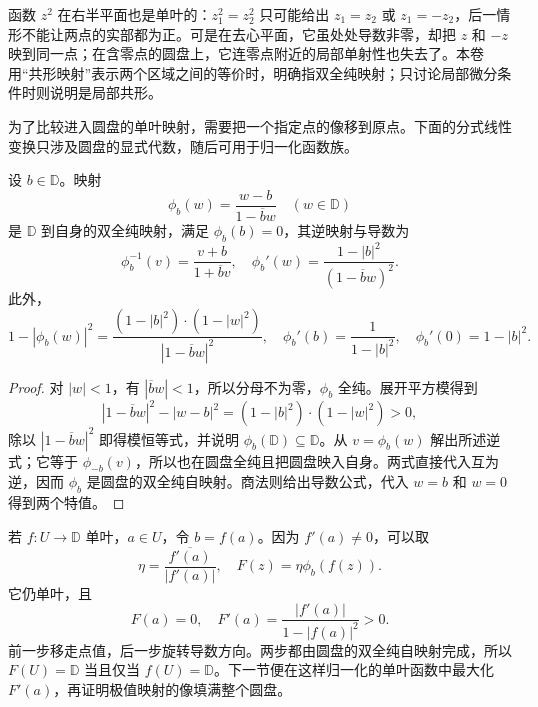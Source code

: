 \ProseParagraphBreak

函数 \(z^2\) 在右半平面也是单叶的：\(z_1^2=z_2^2\) 只可能给出 \(z_1=z_2\) 或 \(z_1=-z_2\)，后一情形不能让两点的实部都为正。可是在去心平面，它虽处处导数非零，却把 \(z\) 和 \(-z\) 映到同一点；在含零点的圆盘上，它连零点附近的局部单射性也失去了。本卷用“共形映射”表示两个区域之间的等价时，明确指双全纯映射；只讨论局部微分条件时则说明是局部共形。

\ProseParagraphBreak

为了比较进入圆盘的单叶映射，需要把一个指定点的像移到原点。下面的分式线性变换只涉及圆盘的显式代数，随后可用于归一化函数族。

\begin{proposition}[圆盘的基点变换]\label{b3:prop:05-disk-basepoint-map}
设 \(b\in\mathbb D\)。映射
\[
 \phi_b(w)=\frac{w-b}{1-\overline b w}\quad(w\in\mathbb D)
\]
是 \(\mathbb D\) 到自身的双全纯映射，满足 \(\phi_b(b)=0\)，其逆映射与导数为
\[
 \phi_b^{-1}(v)=\frac{v+b}{1+\overline b v},
 \quad \phi_b'(w)=\frac{1-|b|^2}{(1-\overline b w)^2}.
\]
此外，
\[
 1-|\phi_b(w)|^2
 =\frac{(1-|b|^2)\cdot(1-|w|^2)}{|1-\overline b w|^2},
 \quad
 \phi_b'(b)=\frac1{1-|b|^2},
 \quad\phi_b'(0)=1-|b|^2.
\]
\end{proposition}
\begin{proof}
对 \(|w|<1\)，有 \(|\overline b w|<1\)，所以分母不为零，\(\phi_b\) 全纯。展开平方模得到
\[
 |1-\overline b w|^2-|w-b|^2
 =(1-|b|^2)\cdot(1-|w|^2)>0,
\]
除以 \(|1-\overline b w|^2\) 即得模恒等式，并说明 \(\phi_b(\mathbb D)\subseteq\mathbb D\)。从 \(v=\phi_b(w)\) 解出所述逆式；它等于 \(\phi_{-b}(v)\)，所以也在圆盘全纯且把圆盘映入自身。两式直接代入互为逆，因而 \(\phi_b\) 是圆盘的双全纯自映射。商法则给出导数公式，代入 \(w=b\) 和 \(w=0\) 得到两个特值。
\end{proof}

若 \(f:U\to\mathbb D\) 单叶，\(a\in U\)，令 \(b=f(a)\)。因为 \(f'(a)\ne0\)，可以取
\[
 \eta=\frac{\overline{f'(a)}}{|f'(a)|},\quad
 F(z)=\eta\phi_b(f(z)).
\]
它仍单叶，且
\[
 F(a)=0,\quad F'(a)=\frac{|f'(a)|}{1-|f(a)|^2}>0.
\]
前一步移走点值，后一步旋转导数方向。两步都由圆盘的双全纯自映射完成，所以 \(F(U)=\mathbb D\) 当且仅当 \(f(U)=\mathbb D\)。下一节便在这样归一化的单叶函数中最大化 \(F'(a)\)，再证明极值映射的像填满整个圆盘。
